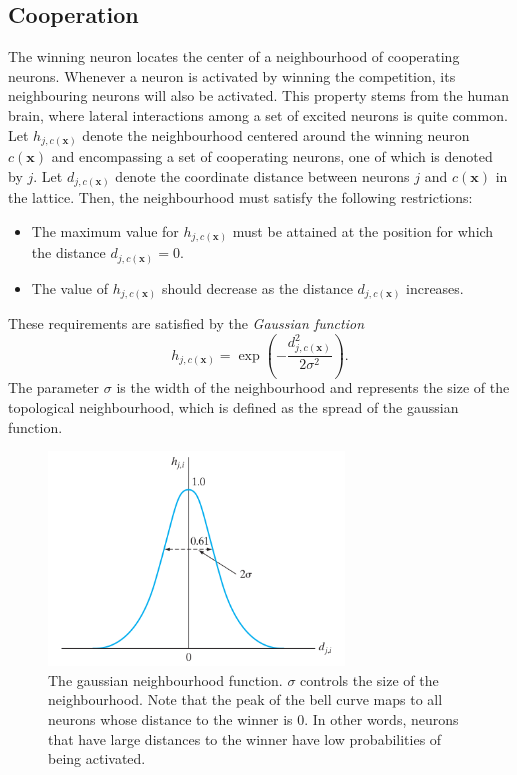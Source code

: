 \documentclass[english]{lni}
\begin{document}
\subsection{Cooperation}
The winning neuron locates the center of a neighbourhood of cooperating neurons.
Whenever a neuron is activated by winning the competition, its neighbouring neurons 
will also be activated. This property stems from the human brain, where lateral 
interactions among a set of excited neurons is quite common.\\
Let $h_{j, c(\mathbf{x})}$ denote the neighbourhood centered around the winning 
neuron $c(\mathbf{x})$ and encompassing a set of cooperating neurons, one of which 
is denoted by $j$. 
Let $d_{j, c(\mathbf{x})}$ denote the coordinate distance between neurons $j$ and $c(\mathbf{x})$
in the lattice. 
Then, the neighbourhood must satisfy the following restrictions:
\begin{itemize}
    \item The maximum value for $h_{j, c(\mathbf{x})}$ must be attained 
    at the position for which the distance $d_{j, c(\mathbf{x})} = 0$.
    \item The value of $h_{j, c(\mathbf{x})}$ should decrease as 
    the distance $d_{j, c(\mathbf{x})}$ increases. 
\end{itemize}
These requirements are satisfied by the \textit{Gaussian function}
\begin{equation}
    h_{j, c(\mathbf{x})} = \exp({-\frac{{d_{j, c(\mathbf{x})}^{2}}}{2\sigma^{2}}}).
\end{equation}
The parameter $\sigma$ is the width of the neighbourhood and represents 
the size of the topological neighbourhood, which is defined as the spread of 
the gaussian function. 
\begin{figure}[H]
    \centering
    \includegraphics[width=0.70\textwidth]{images/som-neigh.png}
    \caption{The gaussian neighbourhood function. $\sigma$ controls the 
    size of the neighbourhood. Note that the peak of the bell curve maps to all neurons 
    whose distance to the winner is 0. In other words, neurons that have large distances 
    to the winner have low probabilities of being activated.}
    \label{fig:som-neigh}
\end{figure}
\end{document}
